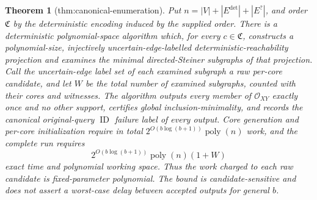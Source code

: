 \documentclass{article}
\newtheorem{theorem}{Theorem}
\begin{document}
\begin{theorem}[thm:canonical-enumeration]\label{thm:canonical-enumeration}
Put \(n=|V|+|E^{\mathrm{det}}|+|E^{?}|\), and order \(\mathfrak C\) by the deterministic encoding induced by the supplied order.  There is a deterministic polynomial-space algorithm which, for every \(c\in\mathfrak C\), constructs a polynomial-size, injectively uncertain-edge-labelled deterministic-reachability projection and examines the minimal directed-Steiner subgraphs of that projection.  Call the uncertain-edge label set of each examined subgraph a raw per-core candidate, and let \(W\) be the total number of examined subgraphs, counted with their cores and witnesses.  The algorithm outputs every member of \(\mathcal O_{XY}\) exactly once and no other support, certifies global inclusion-minimality, and records the canonical original-query \(\operatorname{ID}\) failure label of every output.  Core generation and per-core initialization require in total \(2^{O(b\log(b+1))}\operatorname{poly}(n)\) work, and the complete run requires
\[
 2^{O(b\log(b+1))}\operatorname{poly}(n)(1+W)
\]
exact time and polynomial working space.  Thus the work charged to each raw candidate is fixed-parameter polynomial.  The bound is candidate-sensitive and does not assert a worst-case delay between accepted outputs for general \(b\).
\end{theorem}
\end{document}
